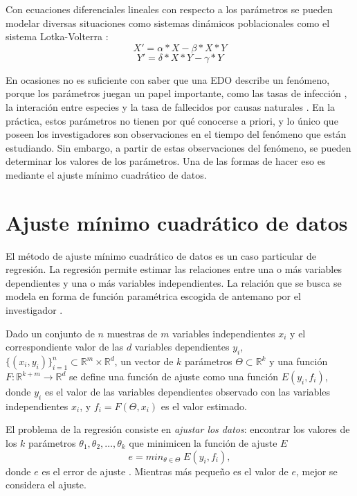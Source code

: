 Con ecuaciones diferenciales lineales con respecto a los parámetros se pueden modelar diversas situaciones como sistemas dinámicos poblacionales como el sistema Lotka-Volterra \cite{Hoppensteadt:2006}:
$$X' = \alpha * X - \beta * X * Y$$
$$Y' = \delta * X * Y - \gamma * Y$$

En ocasiones no es suficiente con saber que una EDO describe un fenómeno, porque los parámetros juegan un papel importante, como las tasas de infección \cite{weiss2013sir}, la interación entre especies \cite{gaucel2014learning} y la tasa de fallecidos por causas naturales \cite{kuddus2021mathematical}. En la práctica, estos parámetros no tienen por qué conocerse a priori, y lo único que poseen los investigadores son observaciones en el tiempo del fenómeno que están estudiando. Sin embargo, a partir de estas observaciones del fenómeno, se pueden determinar los valores de los parámetros. Una de las formas de hacer eso es mediante el ajuste mínimo cuadrático de datos.

\section{Ajuste mínimo cuadrático de datos}\label{section:min_square}

El método de ajuste mínimo cuadrático de datos es un caso particular de regresión. La regresión permite estimar las relaciones entre una o más variables dependientes y una o más variables independientes. La relación que se busca se modela en forma de función paramétrica escogida de antemano por el investigador \cite{johnson2015applied}.

Dado un conjunto de $n$ muestras de $m$ variables independientes $x_i$ y el correspondiente valor de las $d$ variables dependientes $y_i$, $\{(x_i, y_i)\}^n_{i=1} \subset \mathbb{R}^m \times \mathbb{R}^d$, un vector de $k$ parámetros $\Theta \subset \mathbb{R}^k$ y una función $F : \mathbb{R}^{k + m} \rightarrow \mathbb{R}^d$ se define una función de ajuste como una función $E(y_i, f_i)$, donde $y_i$ es el valor de las variables dependientes observado con las variables independientes $x_i$, y $f_i = F(\Theta, x_i)$ es el valor estimado.

El problema de la regresión consiste en \textit{ajustar los datos}: encontrar los valores de los $k$ parámetros $\theta_1, \theta_2, \dots, \theta_k$ que minimicen la función de ajuste $E$
\begin{equation*}
    e = min_{\theta \in \Theta} \; E(y_i, f_i),
\end{equation*}
donde $e$ es el error de ajuste \cite{statisticintroductions}. Mientras más pequeño es el valor de $e$, mejor se considera el ajuste.

